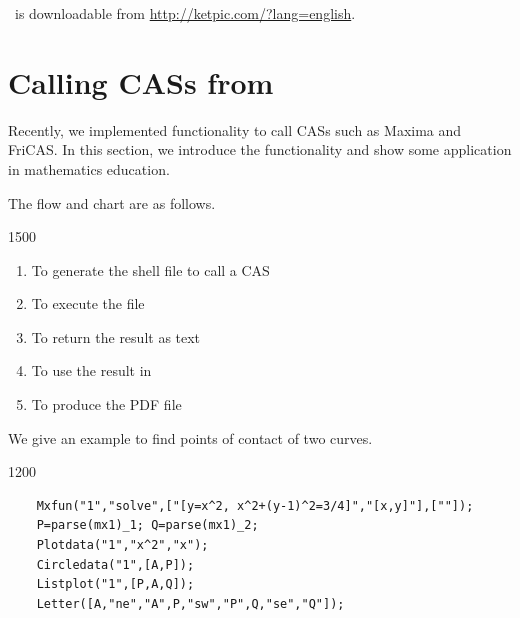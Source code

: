 \documentclass[11pt]{article}
\begin{document}
\vspace{42mm}




\ketcindy\ is downloadable from \url{http://ketpic.com/?lang=english}.

\section{Calling CASs from \ketcindy}

Recently, we implemented functionality to call CASs such as Maxima and FriCAS.
In this section, we introduce the functionality and show some application in mathematics education.

The flow and chart are as follows.\vspace{-1mm}

\begin{layer}{150}{0}
\addtocounter{figno}{1}
\end{layer}

\begin{enumerate}
\item To generate the shell file to call a CAS\vspace{-2mm}
\item To execute the file\vspace{-2mm}
\item To return the result as text\vspace{-2mm}
\item To use the result in \ketcindy\vspace{-2mm}
\item To produce the PDF file\vspace{-2mm}
\end{enumerate}

\vspace{3mm}

We give an example to find points of contact of two curves.\vspace{-2mm}

\begin{layer}{120}{0}
\addtocounter{figno}{1}%
\end{layer}

{\small
\begin{verbatim}
    Mxfun("1","solve",["[y=x^2, x^2+(y-1)^2=3/4]","[x,y]"],[""]);
    P=parse(mx1)_1; Q=parse(mx1)_2;
    Plotdata("1","x^2","x");
    Circledata("1",[A,P]);
    Listplot("1",[P,A,Q]);
    Letter([A,"ne","A",P,"sw","P",Q,"se","Q"]);
\end{verbatim}
}
\end{document}
